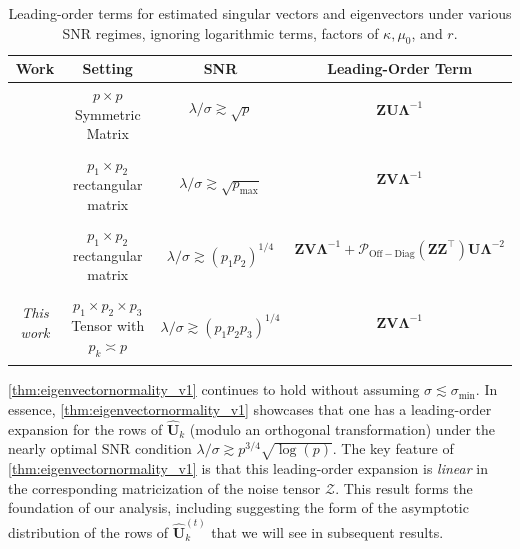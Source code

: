 \documentclass[10pt]{article}
\newcommand{\0}{{\mathbf{0}}}
\newcommand{\1}{{\mathbf{1}}}
\newcommand{\U}{{\mathbf{U}}}
\renewcommand{\citet}{\cite}
\renewcommand{\t}{^{\top}}
\newcommand{\uhat}{\mathbf{\hat{U}}}
\newcommand{\inv}{^{-1}}
\renewcommand{\hat}{\widehat}
\renewcommand{\hat}{\widehat}
\begin{document}
 
 
  \begin{center}
 \begin{table} 
\begin{tabular}{|c|c|c|c|}
\hline
Work & Setting & SNR & Leading-Order Term \\
\hline 
\citet{chen_spectral_2021} & \multirow{2}{6em}{$p \times p$ Symmetric Matrix} & $\lambda/\sigma \gtrsim \sqrt{p}$ & $\mathbf{Z} \mathbf{U} \mathbf{\Lambda}\inv$ \\ &&& \\ &&& \\
\hline
\citet{agterberg_entrywise_2022} & \multirow{2}{6em}{$p_1 \times p_2$ rectangular matrix} & \multirow{2}{6em}{$\lambda/\sigma \gtrsim \sqrt{p_{\max}}$} & $\mathbf{Z} \mathbf{V} \mathbf{\Lambda}\inv$ \\ &&& \\ &&& \\
\hline
\citet{yan_inference_2021} & \multirow{2}{6em}{$p_1 \times p_2$ rectangular matrix} & \multirow{2}{8em}{$\lambda/\sigma \gtrsim (p_1 p_2)^{1/4}$} & $\mathbf{Z} \mathbf{V} \mathbf{\Lambda}\inv + \mathcal{P}_{\mathrm{Off-Diag}}( \mathbf{Z Z}\t ) \U \mathbf{\Lambda}^{-2}$ \\ &&& \\ &&& \\
\hline
\emph{This work} & \multirow{2}{6em}{$p_1 \times p_2 \times p_3$ Tensor with $p_k \asymp p$} & \multirow{2}{9em}{$\lambda/\sigma \gtrsim (p_1 p_2 p_3)^{1/4}$ } & $\mathbf{Z} \mathbf{V} \mathbf{\Lambda}\inv$ \\ &&& \\ &&& \\\hline
\end{tabular}
\caption{Leading-order terms for estimated singular vectors and eigenvectors under various SNR regimes, ignoring logarithmic terms, factors of $\kappa,\mu_0$, and $r$.  \label{tbl:eigenvectorcomparison}}
\end{table}
\end{center}
 
 \cref{thm:eigenvectornormality_v1} continues to hold without assuming $\sigma \lesssim \sigma_{\min}$. In essence, \cref{thm:eigenvectornormality_v1} showcases that one has a leading-order expansion for the rows of $\uhat_k$ (modulo an orthogonal transformation) under the nearly optimal SNR condition $\lambda/\sigma \gtrsim p^{3/4} \sqrt{\log(p)}$.  The key feature of \cref{thm:eigenvectornormality_v1} is that this leading-order expansion is \emph{linear} in the corresponding matricization of the noise tensor $\mathcal{Z}$. This result forms the foundation of our  analysis, including suggesting the form of the asymptotic distribution of the rows of $\uhat_k^{(t)}$ that we will see in subsequent results. %
 
\end{document}
